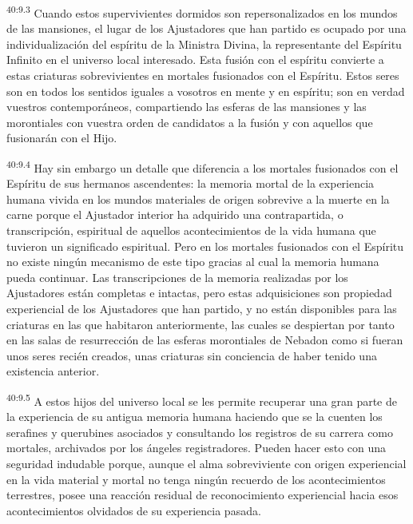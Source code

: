 \par
\textsuperscript{40:9.3} Cuando estos supervivientes dormidos son repersonalizados en los mundos de las mansiones, el lugar de los Ajustadores que han partido es ocupado por una individualización del espíritu de la Ministra Divina, la representante del Espíritu Infinito en el universo local interesado. Esta fusión con el espíritu convierte a estas criaturas sobrevivientes en mortales fusionados con el Espíritu. Estos seres son en todos los sentidos iguales a vosotros en mente y en espíritu; son en verdad vuestros contemporáneos, compartiendo las esferas de las mansiones y las morontiales con vuestra orden de candidatos a la fusión y con aquellos que fusionarán con el Hijo.

\par
\textsuperscript{40:9.4} Hay sin embargo un detalle que diferencia a los mortales fusionados con el Espíritu de sus hermanos ascendentes: la memoria mortal de la experiencia humana vivida en los mundos materiales de origen sobrevive a la muerte en la carne porque el Ajustador interior ha adquirido una contrapartida, o transcripción, espiritual de aquellos acontecimientos de la vida humana que tuvieron un significado espiritual. Pero en los mortales fusionados con el Espíritu no existe ningún mecanismo de este tipo gracias al cual la memoria humana pueda continuar. Las transcripciones de la memoria realizadas por los Ajustadores están completas e intactas, pero estas adquisiciones son propiedad experiencial de los Ajustadores que han partido, y no están disponibles para las criaturas en las que habitaron anteriormente, las cuales se despiertan por tanto en las salas de resurrección de las esferas morontiales de Nebadon como si fueran unos seres recién creados, unas criaturas sin conciencia de haber tenido una existencia anterior.

\par
\textsuperscript{40:9.5} A estos hijos del universo local se les permite recuperar una gran parte de la experiencia de su antigua memoria humana haciendo que se la cuenten los serafines y querubines asociados y consultando los registros de su carrera como mortales, archivados por los ángeles registradores. Pueden hacer esto con una seguridad indudable porque, aunque el alma sobreviviente con origen experiencial en la vida material y mortal no tenga ningún recuerdo de los acontecimientos terrestres, posee una reacción residual de reconocimiento experiencial hacia esos acontecimientos olvidados de su experiencia pasada.

